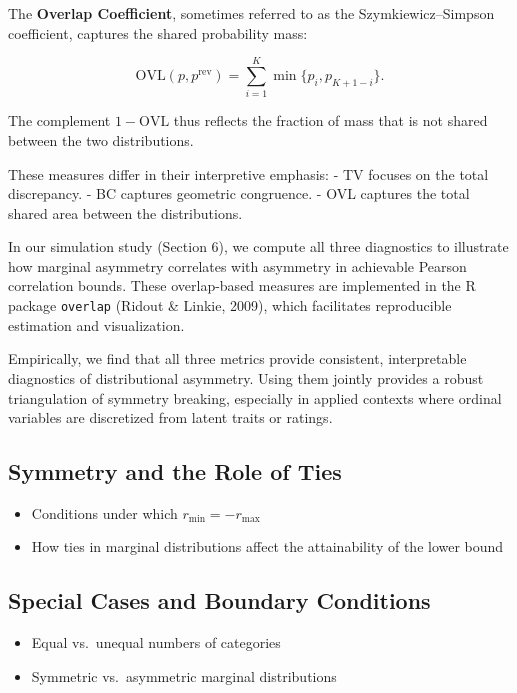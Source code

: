 \documentclass[
  12pt,
]{article}
\providecommand{\tightlist}{%
  \setlength{\itemsep}{0pt}\setlength{\parskip}{0pt}}\usepackage{longtable,booktabs,array}
\theoremstyle{plain}
\theoremstyle{definition}
\theoremstyle{remark}
\begin{document}
The \textbf{Overlap Coefficient}, sometimes referred to as the
Szymkiewicz--Simpson coefficient, captures the shared probability mass:

\[
\text{OVL}(p, p^{\mathrm{rev}}) = \sum_{i=1}^{K} \min\{ p_i, p_{K+1 - i} \}.
\]

The complement \(1 - \text{OVL}\) thus reflects the fraction of mass
that is not shared between the two distributions.

These measures differ in their interpretive emphasis: - TV focuses on
the total discrepancy. - BC captures geometric congruence. - OVL
captures the total shared area between the distributions.

In our simulation study (Section 6), we compute all three diagnostics to
illustrate how marginal asymmetry correlates with asymmetry in
achievable Pearson correlation bounds. These overlap-based measures are
implemented in the R package \texttt{overlap} (Ridout \& Linkie, 2009),
which facilitates reproducible estimation and visualization.

Empirically, we find that all three metrics provide consistent,
interpretable diagnostics of distributional asymmetry. Using them
jointly provides a robust triangulation of symmetry breaking, especially
in applied contexts where ordinal variables are discretized from latent
traits or ratings.

\subsection{Symmetry and the Role of
Ties}\label{symmetry-and-the-role-of-ties}

\begin{itemize}
\tightlist
\item
  Conditions under which \(r_{\min} = -r_{\max}\)
\item
  How ties in marginal distributions affect the attainability of the
  lower bound
\end{itemize}

\subsection{Special Cases and Boundary
Conditions}\label{special-cases-and-boundary-conditions}

\begin{itemize}
\tightlist
\item
  Equal vs.~unequal numbers of categories\\
\item
  Symmetric vs.~asymmetric marginal distributions
\end{itemize}
\end{document}
